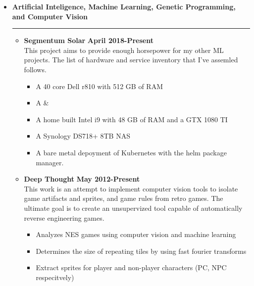 \documentclass[overlapped]{res}
\begin{document}
\begin{resume}
\begin{itemize}[leftmargin=0in]
    \item[] \textbf{Artificial Inteligence, Machine Learning, Genetic Programming, and Computer Vision} \\[-0.1in] \rule{\textwidth}{0.5pt}
        \begin{itemize}[leftmargin=0in]
            \item[] 
                \begin{samepage}
                    \textbf{Segmentum Solar} \hfill \textbf{April 2018-Present} \\
                    This project aims to provide enough horsepower for my other ML projects. The list of hardware and service inventory that I've assemled follows.
                    \begin{itemize}
                        \item[\textbullet] A 40 core Dell r810 with 512 GB of RAM
                        \item[\textbullet] A &%
                        \item[\textbullet] A home built Intel i9 with 48 GB of RAM and a GTX 1080 TI
                        \item[\textbullet] A Synology DS718+ 8TB NAS
                        \item[\textbullet] A bare metal depoyment of Kubernetes with the helm package manager.
                    \end{itemize}
                \end{samepage}
            \item[] 
                \begin{samepage}
                    \textbf{Deep Thought} \hfill \textbf{May 2012-Present} \\
                    This work is an attempt to implement computer vision tools to isolate game artifacts and 
                    sprites, and game rules from retro games. The ultimate goal is to create an unsupervized tool capable of automatically 
                    reverse engineering games.
                    \begin{itemize}
                        \item[\textbullet] Analyzes NES games using computer vision and machine learning
                        \item[\textbullet] Determines the size of repeating tiles by using fast fourier transforms
                        \item[\textbullet] Extract sprites for player and non-player characters (PC, NPC respecitvely)

\end{itemize}
\end{samepage}
\end{itemize}
\end{itemize}
\end{resume}
\end{document}
